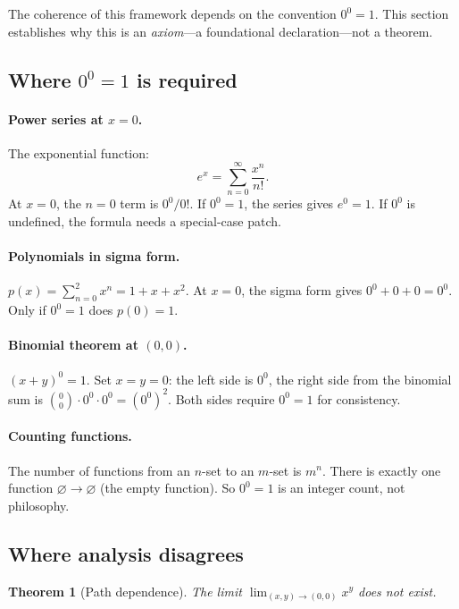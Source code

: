 \documentclass[11pt,a4paper]{article}
\newtheorem{theorem}{Theorem}[section]
\theoremstyle{definition}
\theoremstyle{remark}
\begin{document}
The coherence of this framework depends on the convention $0^{0}=1$. This section establishes why this is an \emph{axiom}---a foundational declaration---not a theorem.

\subsection{Where \texorpdfstring{$0^{0}=1$}{0\^0=1} is required}

\paragraph{Power series at $x=0$.}
The exponential function:
\[
  e^{x} = \sum_{n=0}^{\infty} \frac{x^{n}}{n!}.
\]
At $x=0$, the $n=0$ term is $0^{0}/0!$. If $0^{0}=1$, the series gives $e^{0}=1$. If $0^{0}$ is undefined, the formula needs a special-case patch.

\paragraph{Polynomials in sigma form.}
$p(x) = \sum_{n=0}^{2} x^{n} = 1 + x + x^{2}$. At $x=0$, the sigma form gives $0^{0} + 0 + 0 = 0^{0}$. Only if $0^{0}=1$ does $p(0) = 1$.

\paragraph{Binomial theorem at $(0,0)$.}
$(x+y)^{0} = 1$. Set $x=y=0$: the left side is $0^{0}$, the right side from the binomial sum is $\binom{0}{0}\cdot 0^{0}\cdot 0^{0} = (0^{0})^{2}$. Both sides require $0^{0}=1$ for consistency.

\paragraph{Counting functions.}
The number of functions from an $n$-set to an $m$-set is $m^{n}$. There is exactly one function $\varnothing \to \varnothing$ (the empty function). So $0^{0}=1$ is an integer count, not philosophy.

\subsection{Where analysis disagrees}

\begin{theorem}[Path dependence]\label{thm:path}
The limit $\lim_{(x,y)\to(0,0)} x^{y}$ does not exist.
\end{theorem}
\end{document}
